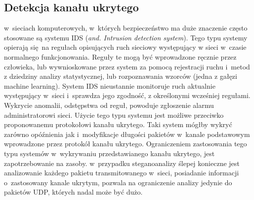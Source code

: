 \documentclass[a4paper, twoside, 12pt]{report}
\begin{document}
       \subsection{Detekcja kanału ukrytego}
       w~sieciach komputerowych, w~których bezpieczeństwo ma duże znaczenie często
       stosowane są systemu IDS (\emph{and. Intrusion detection system}). Tego typu
       systemy opierają się na regułach opisujących ruch sieciowy występujący w
       sieci w~czasie normalnego funkcjonowania. Reguły te mogą być wprowadzone ręcznie
       przez człowieka, lub wywnioskowane przez system za pomocą rejestracji ruchu i~metod z dziedziny
       analizy statystycznej, lub rozpoznawania wzorców (jedna z gałęzi machine learning)\cite{IDSDESCRIPTION}.
       System IDS nieustannie monitoruje ruch aktualnie występujący w~sieci i~sprawdza
       jego zgodność, z określonymi wcześniej regułami. Wykrycie anomalii, odstępstwa
       od reguł, powoduje zgłoszenie alarmu administratorowi sieci. Użycie tego
       typu systemu jest możliwe przeciwko proponowanemu protokołowi kanału ukrytego.
       Taki system mógłby wykryć zarówno opóźnienia jak i~modyfikacje długości
       pakietów w~kanale podstawowym wprowadzone przez protokół kanału ukrytego.
       Ograniczeniem zastosowania tego typu systemów w~wykrywaniu przedstawianego kanału
       ukrytego, jest zapotrzebowanie na zasoby. w~przypadku steganoanalizy ślepej
       konieczne jest analizowanie każdego pakietu transmitowanego w~sieci, posiadanie
       informacji o~zastosowany kanale ukrytym, pozwala na ograniczenie analizy jedynie
       do pakietów UDP, których nadal może być dużo.
\end{document}
